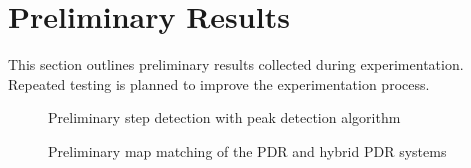 \chapter{Preliminary Results} \label{app:results}
This section outlines preliminary results collected during experimentation. Repeated testing is planned to improve the experimentation process.

  \begin{figure}[htbp!]
  \centering        
  \caption{Preliminary step detection with peak detection algorithm}
  \label{fig:results_1}
  \end{figure}
  
  \begin{figure}[htbp!]
  \centering        
  \caption{Preliminary map matching of the PDR and hybrid PDR systems}
  \label{fig:results_2}
  \end{figure}